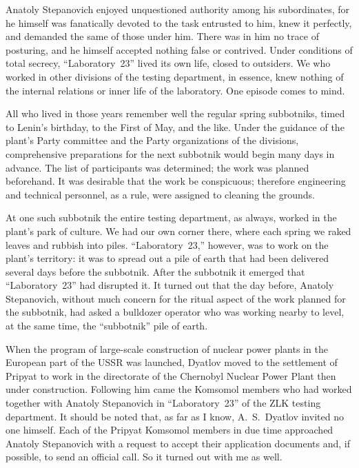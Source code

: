 \documentclass[openright]{bookest}
\begin{document}
Anatoly Stepanovich enjoyed unquestioned authority among his subordinates, for he himself was fanatically devoted to the task entrusted to him, knew it perfectly, and demanded the same of those under him. There was in him no trace of posturing, and he himself accepted nothing false or contrived. Under conditions of total secrecy, ``Laboratory~23'' lived its own life, closed to outsiders. We who worked in other divisions of the testing department, in essence, knew nothing of the internal relations or inner life of the laboratory. One episode comes to mind.

All who lived in those years remember well the regular spring subbotniks, timed to Lenin's birthday, to the First of May, and the like. Under the guidance of the plant's Party committee and the Party organizations of the divisions, comprehensive preparations for the next subbotnik would begin many days in advance. The list of participants was determined; the work was planned beforehand. It was desirable that the work be conspicuous; therefore engineering and technical personnel, as a rule, were assigned to cleaning the grounds.

At one such subbotnik the entire testing department, as always, worked in the plant's park of culture. We had our own corner there, where each spring we raked leaves and rubbish into piles. ``Laboratory~23,'' however, was to work on the plant's territory: it was to spread out a pile of earth that had been delivered several days before the subbotnik. After the subbotnik it emerged that ``Laboratory~23'' had disrupted it. It turned out that the day before, Anatoly Stepanovich, without much concern for the ritual aspect of the work planned for the subbotnik, had asked a bulldozer operator who was working nearby to level, at the same time, the ``subbotnik'' pile of earth.

When the program of large-scale construction of nuclear power plants in the European part of the USSR was launched, Dyatlov moved to the settlement of Pripyat to work in the directorate of the Chernobyl Nuclear Power Plant then under construction. Following him came the Komsomol members who had worked together with Anatoly Stepanovich in ``Laboratory~23'' of the ZLK testing department. It should be noted that, as far as I know, A.~S.~Dyatlov invited no one himself. Each of the Pripyat Komsomol members in due time approached Anatoly Stepanovich with a request to accept their application documents and, if possible, to send an official call. So it turned out with me as well.
\end{document}
